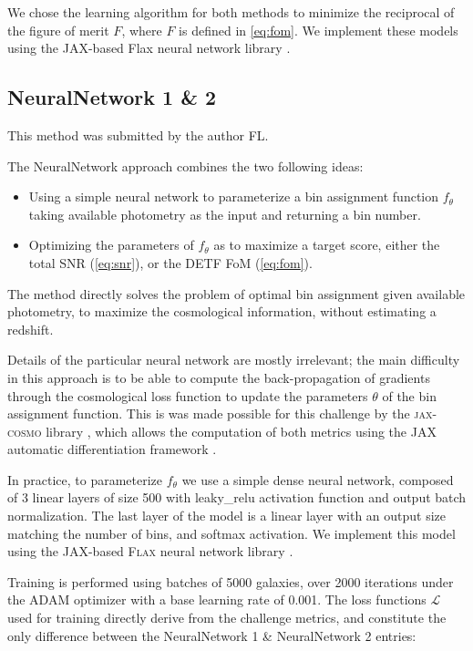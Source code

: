 \documentclass[twocolumn,twocolappendix]{aastex63}
\begin{document}
We chose the learning algorithm for both methods to minimize the reciprocal of
the figure of merit $F$, where $F$ is defined in \autoref{eq:fom}. We implement
these models using the JAX-based Flax neural network library \cite{jax}. 


\subsection{ {\sc NeuralNetwork 1 \& 2} } \label{sec:nn}
This method was submitted by the author FL.

The {\sc NeuralNetwork} approach combines the two following ideas:
\begin{itemize}
	\item Using a simple neural network to parameterize a bin assignment function $f_\theta$ taking available photometry as the input and returning a bin number. 
	\item Optimizing the parameters of $f_\theta$ as to maximize a target score, either the total SNR (\autoref{eq:snr}), or the DETF FoM (\autoref{eq:fom}).
\end{itemize}
The method directly solves the problem of optimal bin assignment given available photometry, to maximize the cosmological information, without estimating a redshift.


Details of the particular neural network are mostly irrelevant; the main difficulty in this approach is to be able to compute the back-propagation of gradients through the cosmological loss function to update the parameters $\theta$ of the bin assignment function. This is was made possible for this challenge by the \textsc{jax-cosmo} library \citep{jax-cosmo}, which allows the computation of both metrics using the JAX automatic differentiation framework \citep{jax}. 


In practice, to parameterize $f_\theta$ we use a simple dense neural network, composed of 3 linear layers of size 500 with leaky\_relu activation function and output batch normalization. The last layer of the model is a linear layer with an output size matching the number of bins, and softmax activation. We implement this model using the JAX-based \textsc{Flax} neural network library \citep{flax2020github}. 

Training is performed using batches of 5000 galaxies, over 2000 iterations under the ADAM optimizer \citep{adam} with a base learning rate of 0.001. The loss functions $\mathcal{L}$ used for training directly derive from the challenge metrics, and constitute the only difference between the NeuralNetwork 1 \& NeuralNetwork 2 entries:
\end{document}
